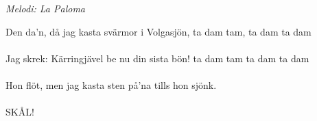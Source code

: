 {\footnotesize\textit{Melodi: La Paloma}}\par
\vspace{10pt}
Den da'n, då jag kasta svärmor i Volgasjön, ta dam tam, ta dam ta dam\\\\
Jag skrek: Kärringjävel be nu din sista bön! ta dam tam ta dam ta dam\\\\
Hon flöt, men jag kasta sten på'na tills hon sjönk.\\\\
SKÅL!
